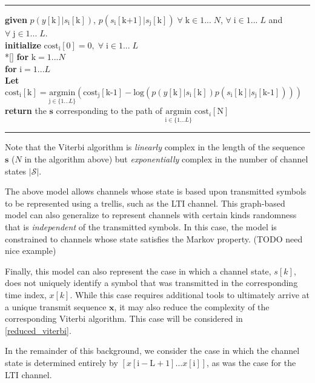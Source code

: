     \noindent\rule[10pt]{\textwidth}{0.4pt}
    {\footnotesize
    \begin{tabbing}
        {\textbf{given}} $p(y[\text{k}]|s_{\text{i}}[\text{k}])$, $p(s_{\text{i}}[\text{k+1}]|s_{\text{j}}[\text{k}]) \; \forall  \; \text{k} \in {1...\;N}$, $ \forall \; \text{i} \in {1...\;L}$ and $ \forall \; \text{j} \in {1...\;L}$.\\
        {\textbf{initialize}} $\text{cost}_{\text{i}}[0]=0, \; \forall \; \text{i} \in {1...\;L}$
         \\*[\smallskipamount]
        {\textbf{for}  $\text{k} = 1... N $} \\
         \qquad \= {\textbf{for} $\text{i} = 1... L$}\\
        \qquad \qquad \= \textbf{Let} $\text{cost}_{\text{i}}[\text{k}] = \underset{\text{j} \in \{1...L\}} {\text{argmin}}\left( \text{cost}_{\text{j}}[\text{k-1}]
        -\text{log}(p(y[\text{k}]|s_{\text{i}}[\text{k}])p(s_{\text{i}}[\text{k}]|s_{\text{j}}[\text{k-1}]))
        \right)$ \\
        {\textbf{ return}} the $\mathbf{s}$ corresponding to the path of $\underset{\text{i} \in \{1...L\}} {\text{argmin}} \; \text{cost}_{i}[\text{N}] $
    \end{tabbing}}
    \noindent\rule[10pt]{\textwidth}{0.4pt}





Note that the Viterbi algorithm is \emph{linearly} complex in the length of the sequence $\mathbf{s}$ ($N$ in the algorithm above) but \emph{exponentially} complex in the number of channel states $|\mathcal{S}|$. 
\par
The above model allows channels whose state is based upon transmitted symbols to be represented using a trellis, such as the LTI channel. This graph-based model can also generalize to represent channels with certain kinds randomness that is \emph{independent} of the transmitted symbols. In this case, the model is constrained to channels whose state satisfies the Markov property.
(TODO need nice example)
\par
Finally, this model can also represent the case in which a channel state, $s[k]$, does not uniquely identify a symbol that was transmitted in the corresponding time index, $x[k]$. While this case requires additional tools to ultimately arrive at a unique transmit sequence $\mathbf{x}$, it may also reduce the complexity of the corresponding Viterbi algorithm. This case will be considered in \ref{reduced_viterbi}.
\par
In the remainder of this background, we consider the case in which the  channel state is determined entirely by $\left[x[\mathrm{i-L+1}]...x[\mathrm{i}]\right]$, as was the case for the LTI channel. 

